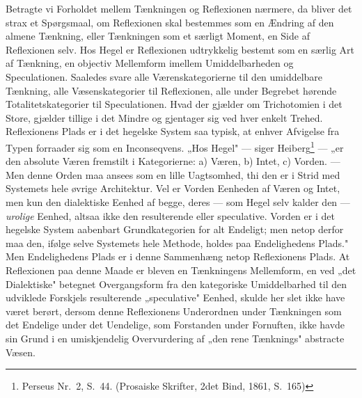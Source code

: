 \documentclass[12pt]{book}
\newcommand{\opage}[1]{\marginnote{\footnotesize\textit{[#1]}}}
\begin{document}
Betragte vi Forholdet mellem Tænkningen og Reflexionen nærmere, da bliver det
strax et Spørgsmaal, om Reflexionen skal bestemmes som en Ændring af den almene
Tænkning, eller Tænkningen som et særligt Moment, en Side af Reflexionen selv. Hos
Hegel er Reflexionen udtrykkelig bestemt som en særlig Art af Tænkning, en
objectiv Mellemform imellem Umiddelbarheden og Speculationen. Saaledes svare alle
Værenskategorierne til den umiddelbare Tænkning, alle Væsenskategorier til
Reflexionen, alle under Begrebet hørende Totalitetskategorier til Speculationen.
Hvad der gjælder om Trichotomien i det Store, gjælder tillige i det Mindre og
gjentager sig ved hver enkelt Trehed. Reflexionens Plads er i det hegelske System
saa typisk, at enhver Afvigelse fra Typen forraader sig som en Inconseqvens. „Hos
Hegel" --- siger Heiberg\footnote{Perseus Nr.~2, S.~44. (Prosaiske Skrifter, 2det
Bind, 1861, S.~165)} --- „er den absolute Væren fremstilt i Kategorierne:
\opage{56} a) Væren, b) Intet, c) Vorden. --- Men denne Orden maa ansees som en lille
Uagtsomhed, thi den er i Strid med Systemets hele øvrige Architektur. Vel er
Vorden Eenheden af Væren og Intet, men kun den dialektiske Eenhed af begge, deres
--- som Hegel selv kalder den --- \emph{urolige} Eenhed, altsaa ikke den
resulterende eller speculative. Vorden er i det hegelske System aabenbart
Grundkategorien for alt Endeligt; men netop derfor maa den, ifølge selve Systemets
hele Methode, holdes paa Endelighedens Plads." Men Endelighedens Plads er i denne
Sammenhæng netop Reflexionens Plads. At Reflexionen paa denne Maade er bleven en
Tænkningens Mellemform, en ved „det Dialektiske" betegnet Overgangsform fra den
kategoriske Umiddelbarhed til den udviklede Forskjels resulterende „speculative"
Eenhed, skulde her slet ikke have været berørt, dersom denne Reflexionens
Underordnen under Tænkningen som det Endelige under det Uendelige, som Forstanden
under Fornuften, ikke havde sin Grund i en umiskjendelig Overvurdering af „den
rene Tænknings" abstracte Væsen.
\end{document}
